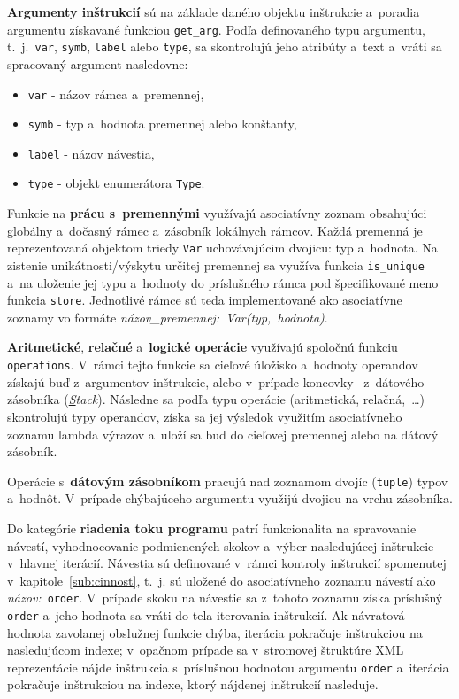 \documentclass[a4paper, 10pt, twocolumn]{article}
\begin{document}
        \textbf{Argumenty inštrukcií} sú na základe daného objektu inštrukcie a~poradia argumentu získavané funkciou \texttt{get\_arg}. Podľa definovaného typu argumentu, t.~j.~\texttt{var}, \texttt{symb}, \texttt{label} alebo \texttt{type}, sa skontrolujú jeho atribúty a~text a~vráti sa spracovaný argument nasledovne:
        \begin{itemize}[noitemsep,topsep=2pt]
            \item \texttt{var} - názov rámca a~premennej,
            \item \texttt{symb} - typ a~hodnota premennej alebo konštanty,
            \item \texttt{label} - názov návestia,
            \item \texttt{type} - objekt enumerátora \texttt{Type}.
        \end{itemize} \smallskip
        
        Funkcie na \textbf{prácu s~premennými} využívajú asociatívny zoznam obsahujúci globálny a~dočasný rámec a~zásobník lokálnych rámcov. Každá premenná je reprezentovaná objektom triedy \texttt{Var} uchovávajúcim dvojicu: typ a~hodnota. Na zistenie unikátnosti/výskytu určitej premennej sa využíva funkcia \texttt{is\_unique} a~na uloženie jej typu a~hodnoty do príslušného rámca pod špecifikované meno funkcia \texttt{store}. Jednotlivé rámce sú teda implementované ako asociatívne zoznamy vo formáte \mbox{\textit{názov\_premennej: Var(typ, hodnota)}}.
        
        \textbf{Aritmetické}, \textbf{relačné} a~\textbf{logické operácie} využívajú spoločnú funkciu \texttt{operations}. V~rámci tejto funkcie sa cieľové úložisko a~hodnoty operandov získajú buď z~argumentov inštrukcie, alebo v~prípade koncovky~ z~dátového zásobníka (\textit{\underline{S}tack}). Následne sa podľa typu operácie (aritmetická, relačná,~\dots) skontrolujú typy operandov, získa sa jej výsledok využitím asociatívneho zoznamu lambda výrazov a~uloží sa buď do cieľovej premennej alebo na dátový zásobník.
        
        Operácie s~\textbf{dátovým zásobníkom} pracujú nad zoznamom dvojíc (\texttt{tuple}) typov a~hodnôt. V~prípade chýbajúceho argumentu využijú dvojicu na vrchu zásobníka.
        
        Do kategórie \textbf{riadenia toku programu} patrí funkcionalita na spravovanie návestí, vyhodnocovanie podmienených skokov a~výber nasledujúcej inštrukcie v~hlavnej iterácií. Návestia sú definované v~rámci kontroly inštrukcií spomenutej v~kapitole~\ref{sub:cinnost}, t.~j. sú uložené do asociatívneho zoznamu návestí ako \textit{názov:}~\texttt{order}. V~prípade skoku na návestie sa z~tohoto zoznamu získa príslušný \texttt{order} a~jeho hodnota sa vráti do tela iterovania inštrukcií. Ak návratová hodnota zavolanej obslužnej funkcie chýba, iterácia pokračuje inštrukciou na nasledujúcom indexe; v~opačnom prípade sa v~stromovej štruktúre XML reprezentácie nájde inštrukcia s~príslušnou hodnotou argumentu \texttt{order} a~iterácia pokračuje inštrukciou na indexe, ktorý nájdenej inštrukcií nasleduje.
        
\end{document}

